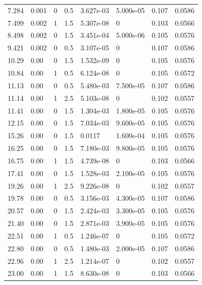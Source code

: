 \documentclass[preview]{standalone}
\begin{document}
{{\begin{tabular}{L{1.2cm}C{1.2cm} C{0.3cm}C{0.5cm} C{1.4cm}C{1.4cm} C{1.4cm}C{1.4cm}}
  7.284  &  0.001  & 0     & 0.5 &  3.627e-03  & 5.000e-05  & 0.107 &  0.0586   \\ 
  7.499  &  0.002  & 1     & 1.5 &  5.307e-08  & 0  & 0.103 &  0.0566   \\ 
  8.498  &  0.002  & 0     & 1.5 &  3.451e-04  & 5.000e-06  & 0.105 &  0.0576   \\ 
  9.421  &  0.002  & 0     & 0.5 &  3.107e-05  & 0  & 0.107 &  0.0586   \\ 
  10.29  &  0.00  & 0     & 1.5 &  1.532e-09  & 0  & 0.105 &  0.0576   \\ 
  10.84  &  0.00  & 1     & 0.5 &  6.124e-08  & 0  & 0.105 &  0.0572   \\ 
  11.13  &  0.00  & 0     & 0.5 &  5.480e-03  & 7.500e-05  & 0.107 &  0.0586   \\ 
  11.14  &  0.00  & 1     & 2.5 &  5.103e-08  & 0  & 0.102 &  0.0557   \\ 
  11.41  &  0.00  & 0     & 1.5 &  1.304e-03  & 1.800e-05  & 0.105 &  0.0576   \\ 
  12.15  &  0.00  & 0     & 1.5 &  7.034e-03  & 9.600e-05  & 0.105 &  0.0576   \\ 
  15.26  &  0.00  & 0     & 1.5 &  0.0117  & 1.600e-04  & 0.105 &  0.0576   \\ 
  16.25  &  0.00  & 0     & 1.5 &  7.180e-03  & 9.800e-05  & 0.105 &  0.0576   \\ 
  16.75  &  0.00  & 1     & 1.5 &  4.739e-08  & 0  & 0.103 &  0.0566   \\ 
  17.41  &  0.00  & 0     & 1.5 &  1.528e-03  & 2.100e-05  & 0.105 &  0.0576   \\ 
  19.26  &  0.00  & 1     & 2.5 &  9.226e-08  & 0  & 0.102 &  0.0557   \\ 
  19.78  &  0.00  & 0     & 0.5 &  3.156e-03  & 4.300e-05  & 0.107 &  0.0586   \\ 
  20.57  &  0.00  & 0     & 1.5 &  2.424e-03  & 3.300e-05  & 0.105 &  0.0576   \\ 
  21.40  &  0.00  & 0     & 1.5 &  2.871e-03  & 3.900e-05  & 0.105 &  0.0576   \\ 
  22.51  &  0.00  & 1     & 0.5 &  1.246e-07  & 0  & 0.105 &  0.0572   \\ 
  22.80  &  0.00  & 0     & 0.5 &  1.480e-03  & 2.000e-05  & 0.107 &  0.0586   \\ 
  22.96  &  0.00  & 1     & 2.5 &  1.214e-07  & 0  & 0.102 &  0.0557   \\ 
  23.00  &  0.00  & 1     & 1.5 &  8.630e-08  & 0  & 0.103 &  0.0566   \\ 

\end{tabular}}}
\end{document}
